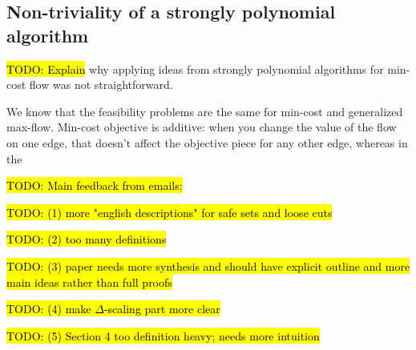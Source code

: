 \documentclass[11pt]{article}
\theoremstyle{definition}
\theoremstyle{definition}
\theoremstyle{definition}
\renewcommand{\todo}[1]{\hl{TODO: #1}}
\begin{document}
	\subsection{Non-triviality of a strongly polynomial algorithm}

	\todo{Explain} why applying ideas from strongly polynomial algorithms for
	min-cost flow was not straightforward. 

	We know that the feasibility problems are the same for min-cost and
	generalized max-flow. Min-cost objective is additive: when you change the
	value of the flow on one edge, that doesn't affect the objective piece for any
	other edge, whereas in the
    
    \vspace{10mm}
\todo{Main feedback from emails:} 

\todo{(1) more "english descriptions" for safe sets and loose cuts}

\todo{(2) too many definitions}

\todo{(3) paper needs more synthesis and should have explicit outline and more main ideas rather than full proofs}

\todo{(4) make $\Delta$-scaling part more clear}

\todo{(5) Section 4 too definition heavy; needs more intuition}


\setlength{\bibitemsep}{0pt}
\nocite{*}
\printbibliography
\end{document}
